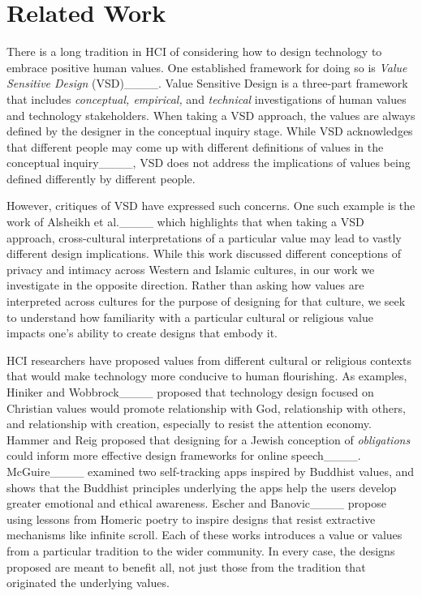 \section{Related Work}
There is a long tradition in HCI of considering how to design technology to embrace positive human values. One established framework for doing so is \textit{Value Sensitive Design} (VSD)____. Value Sensitive Design is a three-part framework that includes \textit{conceptual, empirical,} and \textit{technical} investigations of human values and technology stakeholders. When taking a VSD approach, the values are always defined by the designer in the conceptual inquiry stage. While VSD acknowledges that different people may come up with different definitions of values in the conceptual inquiry____, VSD does not address the implications of values being defined differently by different people.

However, critiques of VSD have expressed such concerns. One such example is the work of Alsheikh et al.____ which highlights that when taking a VSD approach, cross-cultural interpretations of a particular value may lead to vastly different design implications. While this work discussed different conceptions of privacy and intimacy across Western and Islamic cultures, in our work we investigate in the opposite direction. Rather than asking how values are interpreted across cultures for the purpose of designing for that culture, we seek to understand how familiarity with a particular cultural or religious value impacts one's ability to create designs that embody it.

HCI researchers have proposed values from different cultural or religious contexts that would make technology more conducive to human flourishing. As examples, Hiniker and Wobbrock____ proposed that technology design focused on Christian values would promote relationship with God, relationship with others, and relationship with creation, especially to resist the attention economy. Hammer and Reig proposed that designing for a Jewish conception of \textit{obligations} could inform more effective design frameworks for online speech____. McGuire____ examined two self-tracking apps inspired by Buddhist values, and shows that the Buddhist principles underlying the apps help the users develop greater emotional and ethical awareness. Escher and Banovic____ propose using lessons from Homeric poetry to inspire designs that resist extractive mechanisms like infinite scroll. Each of these works introduces a value or values from a particular tradition to the wider community. In every case, the designs proposed are meant to benefit all, not just those from the tradition that originated the underlying values.